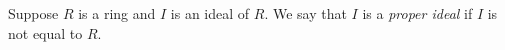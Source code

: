 \documentclass[12pt]{article}
\begin{document}
Suppose $R$ is a ring and $I$ is an ideal of $R$.  We say that $I$ is a {\it proper ideal} if $I$ is not equal to $R$.
\end{document}
